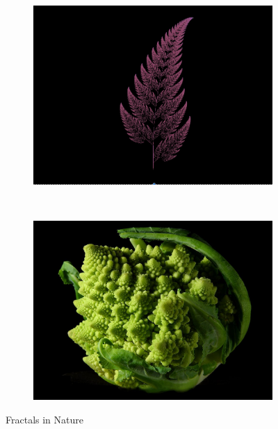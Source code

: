 \begin{figure}
        \centering
        \begin{subfigure}[b]{0.4\textwidth}
                \includegraphics[width=\textwidth]{img/Theory/Fractals/Leaf.png}
                \label{fig:Fleaf}
        \end{subfigure}%
        ~ %
        \begin{subfigure}[b]{0.4\textwidth}
                \includegraphics[width=\textwidth]{img/Theory/Fractals/Fractal_Broccoli.jpg}
                \label{fig:Fbrocoli}
        \end{subfigure}
        \caption{Fractals in Nature}\label{fig:NFractals}
\end{figure}


